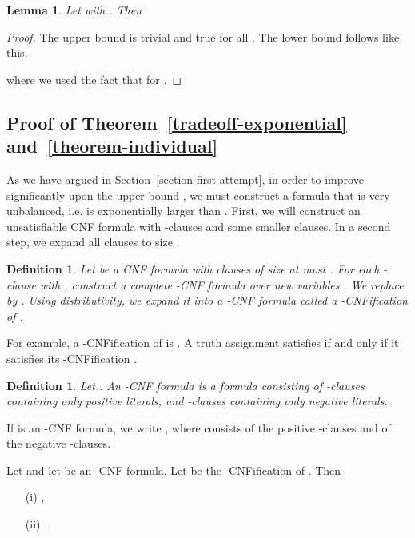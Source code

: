 \documentclass[a4paper, 11pt]{article}
\newtheorem{lemma}[theorem]{Lemma}
\newtheorem{definition}[theorem]{Definition}
\begin{document}
\begin{lemma}\label{lem:technical}
  Let  with . Then
  
\end{lemma}

\begin{proof}
  The upper bound is trivial and true for all . The lower bound
  follows like this.

where we used the fact that  for .
\end{proof}


\subsection{Proof of Theorem~\ref{tradeoff-exponential} and~\ref{theorem-individual}}

As we have argued in Section~\ref{section-first-attempt}, in order to
improve significantly upon the upper bound , we must
construct a formula that is very unbalanced, i.e.   is
exponentially larger than .
First, we will construct an unsatisfiable CNF formula with -clauses
and some smaller clauses.
In a second step, we expand all
clauses to size .


\begin{definition}
  Let  be a CNF formula with clauses of size at most .  For each
  -clause  with , construct a complete -CNF
  formula  over  new variables
  . We replace  by . Using distributivity, we expand it into a
  -CNF formula  called a \emph{-CNFification of }.
\end{definition}

For example, a -CNFification of  is . A truth
assignment satisfies  if and only if it satisfies its
-CNFification .

\begin{definition}
  Let . An -CNF formula is a
  formula consisting of -clauses containing only positive
  literals, and -clauses containing only negative literals.
\end{definition}

If  is an -CNF formula, we write ,
where  consists of the positive -clauses and  of
the negative -clauses.

\begin{proposition}
  Let  and let  be an -CNF
  formula.  Let  be the -CNFification of . Then
  \begin{itemize}
    \item[(i)] ,
    \item[(ii)] .
  \end{itemize}
\label{prop-lk}
\end{proposition}
\end{document}
